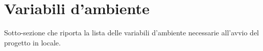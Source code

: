 \section{Variabili d'ambiente}

Sotto-sezione che riporta la lista delle variabili d'ambiente necessarie all'avvio del progetto in locale.
